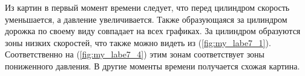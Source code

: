 \documentclass[12pt, a4paper]{article}
\begin{document}
Из картин в первый момент времени следует, что перед цилиндром скорость уменьшается, а давление увеличивается. Также образующаяся за цилиндром дорожка по своему виду совпадает на всех графиках.
За цилиндром образуются зоны низких скоростей, что также можно видеть из (\ref{fig:my_labe7_1}). Соответственно на (\ref{fig:my_labe7_4}) этим зонам соответствует зоны пониженного давления. 
В другие моменты времени получается схожая картина.

\newpage
{}
\begin{figure}[H]
    \centering
\end{figure}
\end{document}

